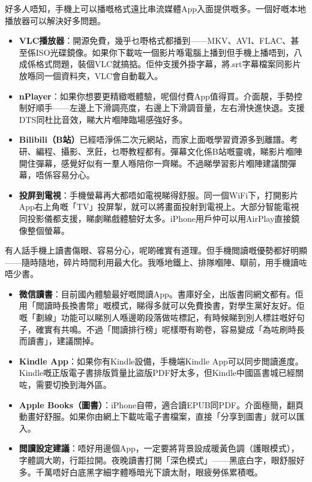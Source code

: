 
好多人唔知，手機上可以播嘅格式遠比串流媒體App入面提供嘅多。一個好嘅本地播放器可以解決好多問題。

\begin{itemize}
  \item \textbf{VLC播放器}：開源免費，幾乎乜嘢格式都播到——MKV、AVI、FLAC、甚至係ISO光碟鏡像。如果你下載咗一個影片喺電腦上播到但手機上播唔到，八成係格式問題，裝個VLC就搞掂。佢仲支援外掛字幕，將.srt字幕檔案同影片放喺同一個資料夾，VLC會自動載入。
  \item \textbf{nPlayer}：如果你想要更精緻嘅體驗，呢個付費App值得買。介面靚，手勢控制好順手——左邊上下滑調亮度，右邊上下滑調音量，左右滑快進快退。支援DTS同杜比音效，睇大片嗰陣臨場感強好多。
  \item \textbf{Bilibili（B站）}已經唔淨係二次元網站，而家上面嘅學習資源多到離譜。考研、編程、攝影、烹飪，乜嘢教程都有。彈幕文化係B站嘅靈魂，睇影片嗰陣開住彈幕，感覺好似有一羣人喺陪你一齊睇。不過睇學習影片嗰陣建議關彈幕，唔係容易分心。
  \item \textbf{投屏到電視}：手機螢幕再大都唔如電視睇得舒服。同一個WiFi下，打開影片App右上角嘅「TV」投屏掣，就可以將畫面投射到電視上。大部分智能電視同投影儀都支援，睇劇睇戲體驗好太多。iPhone用戶仲可以用AirPlay直接鏡像整個螢幕。
\end{itemize}


有人話手機上讀書傷眼、容易分心，呢啲確實有道理。但手機閲讀嘅優勢都好明顯——隨時隨地，碎片時間利用最大化。我喺地鐵上、排隊嗰陣、瞓前，用手機讀咗唔少書。

\begin{itemize}
  \item \textbf{微信讀書}：目前國內體驗最好嘅閲讀App。書庫好全，出版書同網文都有。佢用「閲讀時長換書幣」嘅模式，睇得多就可以免費換書，對學生黨好友好。佢嘅「劃線」功能可以睇別人喺邊啲段落做咗標記，有時候睇到別人標註嘅好句子，確實有共鳴。不過「閲讀排行榜」呢樣嘢有啲卷，容易變成「為咗刷時長而讀書」，建議關掉。
  \item \textbf{Kindle App}：如果你有Kindle設備，手機端Kindle App可以同步閲讀進度。Kindle嘅正版電子書排版質量比盜版PDF好太多，但Kindle中國區書城已經關咗，需要切換到海外區。
  \item \textbf{Apple Books（圖書）}：iPhone自帶，適合讀EPUB同PDF。介面極簡，翻頁動畫好舒服。如果你由網上下載咗電子書檔案，直接「分享到圖書」就可以匯入。
  \item \textbf{閲讀設定建議}：唔好用邊個App，一定要將背景設成暖黃色調（護眼模式），字體調大啲，行距拉開。夜晚讀書打開「深色模式」——黑底白字，眼舒服好多。千萬唔好白底黑字細字體喺暗光下讀太耐，眼疲勞係累積嘅。
\end{itemize}

